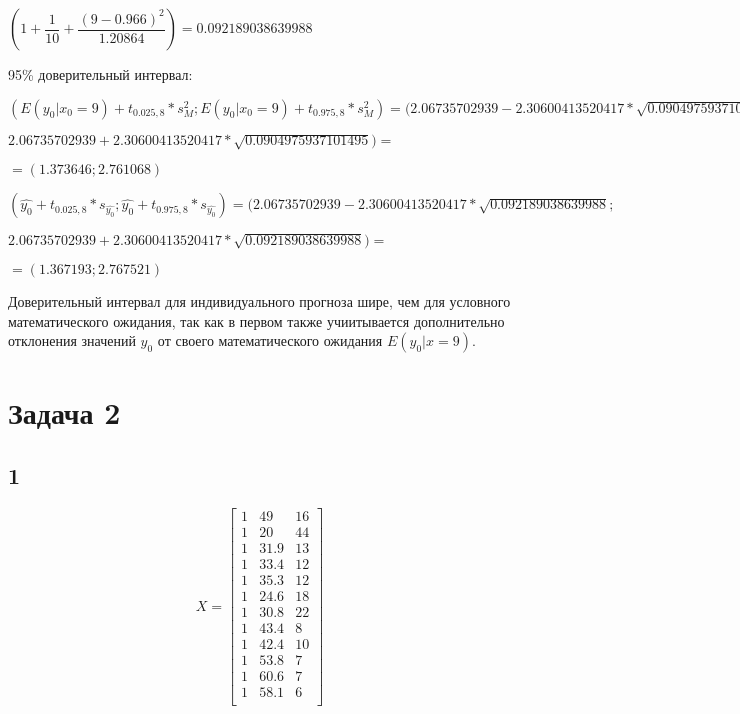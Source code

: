 \documentclass[12pt,a4paper, oneside]{extreport}
\begin{document}
$ \left(1  + \dfrac{1}{10} + \dfrac{(9-0.966)^2}{1.20864 } \right)   = 0.092189038639988$

95\% доверительный интервал:

$(E(y_0|x_0=9) + t_{0.025, 8} * s_{M}^2 ;E(y_0|x_0=9) + t_{0.975, 8} * s_{M}^2  ) = ( 2.06735702939  -  2.30600413520417 * \sqrt{0.0904975937101495} ; $

$  2.06735702939 +  2.30600413520417 * \sqrt{0.0904975937101495} ) = $

$= (1.373646; 2.761068) $


$(\hat{y_0} + t_{0.025, 8}* s_{\hat{y_0}}; \hat{y_0} + t_{0.975, 8}* s_{\hat{y_0}} ) = ( 2.06735702939 -  2.30600413520417 * \sqrt{0.092189038639988} ; $

$  2.06735702939  +  2.30600413520417 * \sqrt{0.092189038639988} ) = $

$= (1.367193; 2.767521) $

Доверительный интервал для индивидуального прогноза шире, чем для условного математического ожидания, так как в первом также учиитывается дополнительно отклонения значений $y_0$ от своего математического ожидания $E(y_0| x = 9)$.


\section*{Задача 2}

\subsection*{1}



\begin{equation}\label{key}
X = 
\begin{bmatrix} 
1 & 49 & 16 \\ 
1 & 20 & 44 \\ 
1 & 31.9 & 13 \\ 
1 & 33.4 & 12 \\ 
1 & 35.3 & 12 \\ 
1 & 24.6 & 18 \\ 
1 & 30.8 & 22 \\ 
1 & 43.4 & 8 \\ 
1 & 42.4 & 10 \\ 
1 & 53.8 & 7 \\ 
1 & 60.6 & 7 \\ 
1 & 58.1 & 6 \\ 
\end{bmatrix}
\end{equation}
\end{document}
